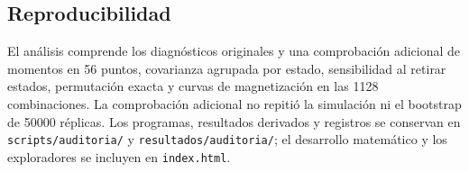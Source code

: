 \subsection{Reproducibilidad}

El análisis comprende los diagnósticos originales y una comprobación adicional de momentos en 56 puntos, covarianza agrupada por estado, sensibilidad al retirar estados, permutación exacta y curvas de magnetización en las 1128 combinaciones. La comprobación adicional no repitió la simulación ni el bootstrap de 50000 réplicas. Los programas, resultados derivados y registros se conservan en \texttt{scripts/auditoria/} y \texttt{resultados/auditoria/}; el desarrollo matemático y los exploradores se incluyen en \texttt{index.html}.
